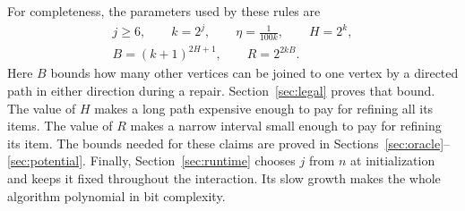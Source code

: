 For completeness, the parameters used by these rules are
\begin{equation}\label{eq:parameters}
\begin{gathered}
j\ge6,\qquad k=2^j,\qquad \eta=\frac1{100k},\qquad H=2^k,\\
B=(k+1)^{2H+1},\qquad R=2^{2kB}.
\end{gathered}
\end{equation}
Here $B$ bounds how many other vertices can be joined to one vertex by a
directed path in either direction during a repair. Section~\ref{sec:legal}
proves that bound. The value of $H$ makes a long path expensive enough to
pay for refining all its items. The value of $R$ makes a narrow interval
small enough to pay for refining its item. The bounds needed for these
claims are proved in Sections~\ref{sec:oracle}--\ref{sec:potential}.
Finally, Section~\ref{sec:runtime} chooses $j$ from $n$ at initialization
and keeps it fixed throughout the interaction. Its slow growth makes the
whole algorithm polynomial in bit complexity.
